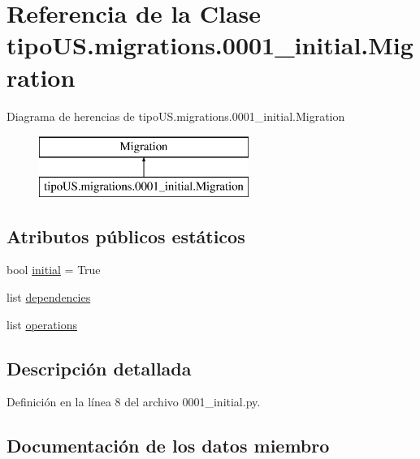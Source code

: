 \hypertarget{classtipo_u_s_1_1migrations_1_10001__initial_1_1_migration}{}\section{Referencia de la Clase tipo\+U\+S.\+migrations.0001\+\_\+initial.Migration}
\label{classtipo_u_s_1_1migrations_1_10001__initial_1_1_migration}
Diagrama de herencias de tipo\+U\+S.\+migrations.0001\+\_\+initial.Migration\begin{figure}[H]
\begin{center}
\leavevmode
\includegraphics[height=2.000000cm]{classtipo_u_s_1_1migrations_1_10001__initial_1_1_migration}
\end{center}
\end{figure}
\subsection*{Atributos públicos estáticos}
\begin{DoxyCompactItemize}
\item 
bool \hyperlink{classtipo_u_s_1_1migrations_1_10001__initial_1_1_migration_af95ca5a99e19092af234ec3a97db6cdc}{initial} = True
\item 
list \hyperlink{classtipo_u_s_1_1migrations_1_10001__initial_1_1_migration_a48568504ede6e2526dd5dbb8b563bb34}{dependencies}
\item 
list \hyperlink{classtipo_u_s_1_1migrations_1_10001__initial_1_1_migration_ac7741faef55d0650df75f2bc97a065d0}{operations}
\end{DoxyCompactItemize}


\subsection{Descripción detallada}


Definición en la línea 8 del archivo 0001\+\_\+initial.\+py.



\subsection{Documentación de los datos miembro}
